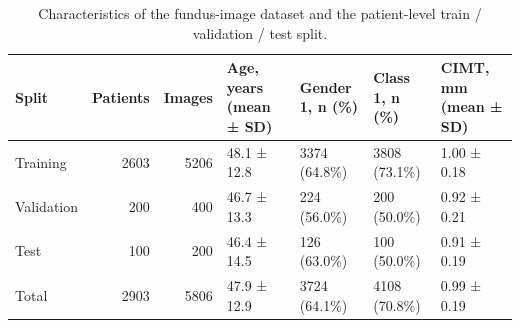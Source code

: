 \begin{table}
\caption{Characteristics of the fundus-image dataset and the patient-level train / validation / test split.}
\label{tab:dataset_characteristics}
\begin{tabular}{lrrllll}
\toprule
Split & Patients & Images & Age, years (mean ± SD) & Gender 1, n (\%) & Class 1, n (\%) & CIMT, mm (mean ± SD) \\
\midrule
Training & 2603 & 5206 & 48.1 ± 12.8 & 3374 (64.8\%) & 3808 (73.1\%) & 1.00 ± 0.18 \\
Validation & 200 & 400 & 46.7 ± 13.3 & 224 (56.0\%) & 200 (50.0\%) & 0.92 ± 0.21 \\
Test & 100 & 200 & 46.4 ± 14.5 & 126 (63.0\%) & 100 (50.0\%) & 0.91 ± 0.19 \\
Total & 2903 & 5806 & 47.9 ± 12.9 & 3724 (64.1\%) & 4108 (70.8\%) & 0.99 ± 0.19 \\
\bottomrule
\end{tabular}
\end{table}
